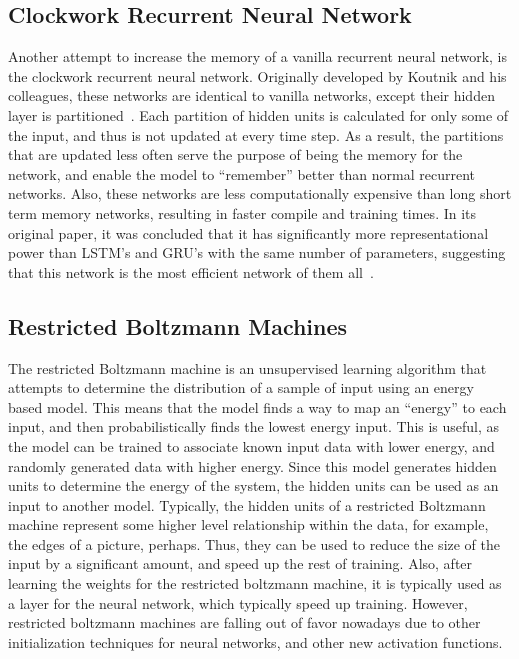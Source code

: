 \documentclass{article}
\begin{document}
\subsection{Clockwork Recurrent Neural Network}
Another attempt to increase the memory of a vanilla recurrent neural network, is
the clockwork recurrent neural network. Originally developed by Koutnik and his
colleagues, these networks are identical to vanilla networks, except their
hidden layer is partitioned~\cite{cw-rnn}. Each partition of hidden units is
calculated for only some of the input, and thus is not updated at every time
step. As a result, the partitions that are updated less often serve the purpose
of being the memory for the network, and enable the model to ``remember'' better
than normal recurrent networks. Also, these networks are less computationally
expensive than long short term memory networks, resulting in faster compile and
training times. In its original paper, it was concluded that it has
significantly more representational power than LSTM's and GRU's with the same
number of parameters, suggesting that this network is the most efficient network
of them all~\cite{cw-rnn}.

\subsection{Restricted Boltzmann Machines}
The restricted Boltzmann machine is an unsupervised learning algorithm that
attempts to determine the distribution of a sample of input using an energy
based model. This means that the model finds a way to map an ``energy'' to each
input, and then probabilistically finds the lowest energy input. This is useful,
as the model can be trained to associate known input data with lower energy, and
randomly generated data with higher energy. Since this model generates hidden
units to determine the energy of the system, the hidden units can be used as an
input to another model. Typically, the hidden units of a restricted Boltzmann
machine represent some higher level relationship within the data, for example,
the edges of a picture, perhaps. Thus, they can be used to reduce the size of
the input by a significant amount, and speed up the rest of training. Also,
after learning the weights for the restricted boltzmann machine, it is typically
used as a layer for the neural network, which typically speed up training.
However, restricted boltzmann machines are falling out of favor nowadays due to
other initialization techniques for neural networks, and other new activation
functions.
\end{document}
